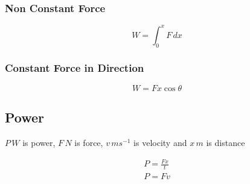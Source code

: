 \documentclass{article}
\begin{document}
\subsubsection{Non Constant Force}

\begin{equation}
	W = \int^{x}_{0} F \,dx
\end{equation}

\subsubsection{Constant Force in Direction}

\begin{equation}
	W = F x \cos \theta
\end{equation}

\subsection{Power}
$P\,\si{W}$ is power, $F\,\si{N}$ is force, $v\,\si{ms^{-1}}$ is velocity and $x\,\si{m}$ is distance

\begin{gather}
	P = \frac{Fx}{t} \\
	P = Fv 
\end{gather}
\end{document}
